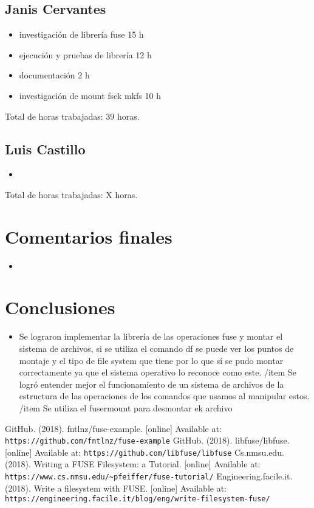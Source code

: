 \documentclass{article}
\begin{document}
\subsection{Janis Cervantes}
\begin{itemize}
  \item investigación de librería fuse 15 h
  \item ejecución y pruebas de librería 12 h
  \item documentación 2 h
  \item investigación de mount fsck mkfs 10 h
\end{itemize}
Total de horas trabajadas: 39 horas.

\subsection{Luis Castillo}
\begin{itemize}
  \item
\end{itemize}
Total de horas trabajadas: X horas.

\section{Comentarios finales}
\begin{itemize}
  \item 
\end{itemize}

\section{Conclusiones}
\begin{itemize}
  \item Se lograron implementar la librería de las operaciones fuse y montar el sistema de archivos, si se utiliza el comando df se puede ver los puntos de montaje y el tipo de file system que tiene por lo que sí se pudo montar correctamente ya que el sistema operativo lo reconoce como este. 
  /item Se logró entender mejor el funcionamiento de un sistema de archivos de la estructura de las operaciones de los comandos que usamos al manipular estos. 
  /item Se utiliza el fusermount para desmontar ek archivo
\end{itemize}

\begin{thebibliography}{99}
   GitHub. (2018). fntlnz/fuse-example. [online] Available at: \texttt{https://github.com/fntlnz/fuse-example}
   GitHub. (2018). libfuse/libfuse. [online] Available at: \texttt{https://github.com/libfuse/libfuse}
   Cs.nmsu.edu. (2018). Writing a FUSE Filesystem: a Tutorial. [online] Available at: \texttt{https://www.cs.nmsu.edu/\~{}pfeiffer/fuse-tutorial/}
   Engineering.facile.it. (2018). Write a filesystem with FUSE. [online] Available at: \texttt{https://engineering.facile.it/blog/eng/write-filesystem-fuse/}
\end{thebibliography}
\end{document}
